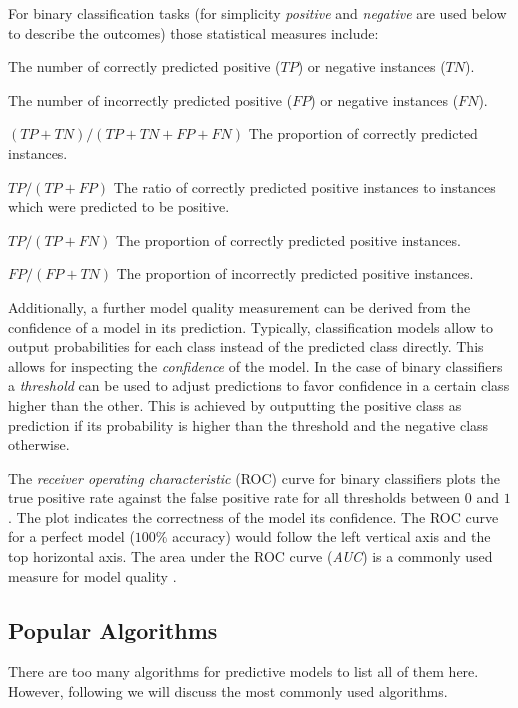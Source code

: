 For binary classification tasks (for simplicity \emph{positive} and \emph{negative} are used below to describe the outcomes) those statistical measures include:

\begin{description}[noitemsep]
    \item[True Positive / Negative]
    The number of correctly predicted positive ($TP$) or negative instances ($TN$).
    \item[False Positive / Negative]
    The number of incorrectly predicted positive ($FP$) or negative instances ($FN$).
    \item[Accuracy]
    $(TP + TN) / (TP + TN + FP + FN)$ The proportion of correctly predicted instances.
    \item[Precision]
    $TP / (TP + FP)$ The ratio of correctly predicted positive instances to instances which were predicted to be positive.
    \item[True Positive Rate / Recall]
    $TP / (TP + FN)$ The proportion of correctly predicted positive instances.
    \item[False Positive Rate]
    $FP / (FP + TN)$ The proportion of incorrectly predicted positive instances.
\end{description}

Additionally, a further model quality measurement can be derived from the confidence of a model in its prediction.
Typically, classification models allow to output probabilities for each class instead of the predicted class directly.
This allows for inspecting the \emph{confidence} of the model.
In the case of binary classifiers a \emph{threshold} can be used to adjust predictions to favor confidence in a certain class higher than the other.
This is achieved by outputting the positive class as prediction if its probability is higher than the threshold and the negative class otherwise.



The \emph{receiver operating characteristic} (ROC) curve for binary classifiers plots the true positive rate against the false positive rate for all thresholds between $0$ and $1$.
The plot indicates the correctness of the model \wrt its confidence.
The ROC curve for a perfect model ($100\%$ accuracy) would follow the left vertical axis and the top horizontal axis.
The area under the ROC curve (\emph{AUC}) is a commonly used measure for model quality \cite{bradley19971145}.

\subsection{Popular Algorithms}
There are too many algorithms for predictive models to list all of them here.
However, following we will discuss the most commonly used algorithms.

